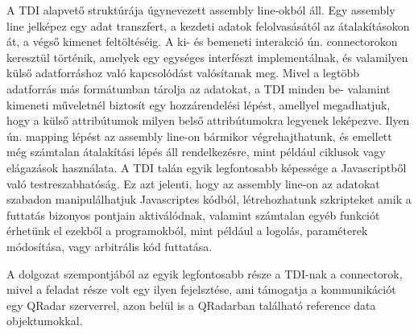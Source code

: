 A TDI alapvető struktúrája úgynevezett assembly line-okból áll. Egy assembly line jelképez egy adat transzfert, a kezdeti adatok felolvasásától az átalakításokon át, a végső kimenet feltöltéséig. A ki- és bemeneti interakció ún. connectorokon keresztül történik, amelyek egy egységes interfészt implementálnak, és valamilyen külső adatforráshoz való kapcsolódást valósítanak meg. Mivel a legtöbb adatforrás más formátumban tárolja az adatokat, a TDI minden be- valamint kimeneti műveletnél biztosít egy hozzárendelési lépést, amellyel megadhatjuk, hogy a külső attribútumok milyen belső attribútumokra legyenek leképezve. Ilyen ún. mapping lépést az assembly line-on bármikor végrehajthatunk, és emellett még számtalan átalakítási lépés áll rendelkezésre, mint például ciklusok vagy elágazások használata. A TDI talán egyik legfontosabb képessége a Javascriptből való testreszabhatóság. Ez azt jelenti, hogy az assembly line-on az adatokat szabadon manipulálhatjuk Javascriptes kódból, létrehozhatunk szkripteket amik a futtatás bizonyos pontjain aktiválódnak, valamint számtalan egyéb funkciót érhetünk el ezekből a programokból, mint például a logolás, paraméterek módosítása, vagy arbitrális kód futtatása.

A dolgozat szempontjából az egyik legfontosabb része a TDI-nak a connectorok, mivel a feladat része volt egy ilyen fejelsztése, ami támogatja a kommunikációt egy QRadar szerverrel, azon belül is a QRadarban található reference data objektumokkal.
